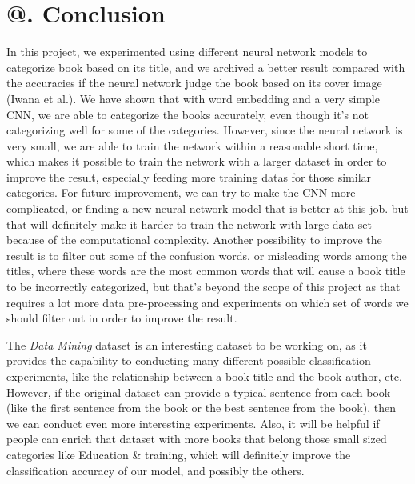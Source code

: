 \documentclass[jou,apacite, 10px]{apa6}
\makeatletter
\newcommand*{\rom}[1]{\expandafter\@slowromancap\romannumeral #1@}
\makeatother
\begin{document}
\section{\rom{6}. Conclusion}
In this project, we experimented using different neural network models to categorize book based on its title, and we archived a better result compared with the accuracies if the neural network judge the book based on its cover image (Iwana et al.). We have shown that with word embedding and a very simple CNN, we are able to categorize the books accurately, even though it's not categorizing well for some of the categories. However, since the neural network is very small, we are able to train the network within a reasonable short time, which makes it possible to train the network with a larger dataset in order to improve the result, especially feeding more training datas for those similar categories. For future improvement, we can try to make the CNN more complicated, or finding a new neural network model that is better at this job. but that will definitely make it harder to train the network with large data set because of the computational complexity. Another possibility to improve the result is to filter out some of the confusion words, or misleading words among the titles, where these words are the most common words that will cause a book title to be incorrectly categorized, but that's beyond the scope of this project as that requires a lot more data pre-processing and experiments on which set of words we should filter out in order to improve the result.

 The \textit{Data Mining} dataset is an interesting dataset to be working on, as it provides the capability to conducting many different possible classification experiments, like the relationship between a book title and the book author, etc. However, if the original dataset can provide a typical sentence from each book (like the first sentence from the book or the best sentence from the book), then we can conduct even more interesting experiments. Also, it will be helpful if people can enrich that dataset with more books that belong those small sized categories like Education \& training, which will definitely improve the classification accuracy of our model, and possibly the others.
\end{document}
